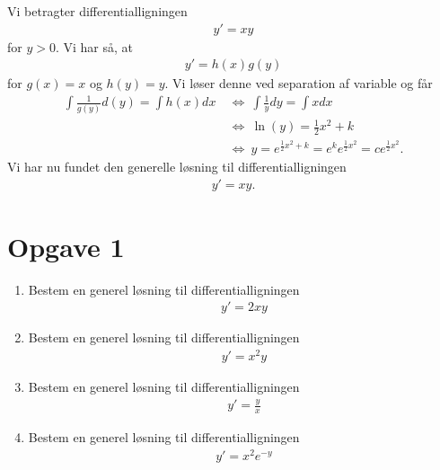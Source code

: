 \begin{exa}
	Vi betragter differentialligningen
	\begin{align*}
		y' = xy
	\end{align*}
	for $y>0$. 
	Vi har så, at 
	\begin{align*}
		y' = h(x)g(y)
	\end{align*}
	for $g(x) =x $ og $h(y) = y$. Vi løser denne ved separation af variable og får
	\begin{align*}
	\int \frac{1}{g(y)}d(y) = \int h(x) dx  \ &\Leftrightarrow \ \int \frac{1}{y} dy = \int x dx\\
	&\Leftrightarrow \ \ln(y) = \frac{1}{2}x^2 + k \\
	& \Leftrightarrow \ y = e^{\frac{1}{2}x^2+k} = e^{k}e^{\frac{1}{2}x^2} = ce^{\frac{1}{2}x^2}.
	\end{align*}
	Vi har nu fundet den generelle løsning til differentialligningen 
	\begin{align*}
		y' = xy.
	\end{align*}
\end{exa}

\section*{Opgave 1}
\begin{enumerate}[label=\roman*)]
	\item Bestem en generel løsning til differentialligningen 
	\begin{align*}
		y' = 2xy
	\end{align*}
	\item  Bestem en generel løsning til differentialligningen 
	\begin{align*}
		y' = x^2y
	\end{align*}
	 \item Bestem en generel løsning til differentialligningen 
	\begin{align*}
		y' = \frac{y}{x}
	\end{align*}
	\item Bestem en generel løsning til differentialligningen 
	\begin{align*}
		y' = x^2e^{-y}
	\end{align*}
\end{enumerate}

